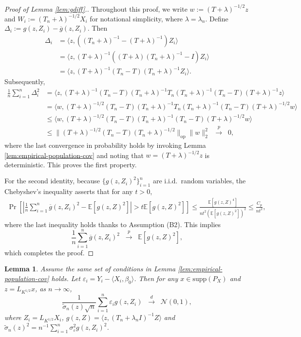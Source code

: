 \documentclass[11pt,a4paper]{article}
\renewcommand{\tilde}{\widetilde}
\renewcommand{\bar}{\overline}
\theoremstyle{definition}
\theoremstyle{plain}
\newtheorem{lemma}{Lemma}[section]
\theoremstyle{remark}
\newcommand{\supp}{\mathrm{supp}}
\newcommand{\op}{\mathrm{op}}
\begin{document}
\begin{proof}[Proof of Lemma \ref{lem:gdiff}.]
Throughout this proof, we write $w := (T+\lambda)^{-1/2} z$ and $W_i := (T_n+\lambda)^{-1/2}X_i$ for notational simplicity, where $\lambda=\lambda_n$.
Define $\Delta_i := g(z,Z_i)-\bar g(z,Z_i)$. Then
\begin{align*}
\Delta_i &= \langle z,((T_n+\lambda )^{-1}-(T+\lambda )^{-1})Z_i\rangle\nonumber\\
&= \langle z, (T+\lambda )^{-1}((T+\lambda )(T_n+\lambda )^{-1}-I)Z_i\rangle\nonumber\\
&= \langle z, (T+\lambda )^{-1}(T_n-T)(T_n+\lambda )^{-1}Z_i\rangle.
\end{align*}
Subsequently,
\begin{align}
\frac{1}{n}\sum_{i=1}^n \Delta_i^2 &= \langle z, (T+\lambda)^{-1}(T_n-T)(T_n+\lambda)^{-1}T_n(T_n+\lambda)^{-1}(T_n-T)(T+\lambda)^{-1}z\rangle\nonumber\\
&= \langle w, (T+\lambda)^{-1/2}(T_n-T)(T_n+\lambda)^{-1}T_n(T_n+\lambda)^{-1}(T_n-T)(T+\lambda)^{-1/2}w\rangle\nonumber\\
&\leq \langle w, (T+\lambda)^{-1/2}(T_n-T)(T_n+\lambda)^{-1}(T_n-T)(T+\lambda)^{-1/2}w\rangle\nonumber\\
&\leq \|(T+\lambda)^{-1/2}(T_n-T)(T_n+\lambda)^{-1/2}\|_\op\|w\|_2^2\;\; \overset{p}{\to}\;\; 0,
\end{align}
where the last convergence in probability holds by invoking Lemma \ref{lem:empirical-population-cov} and noting that $w=(T+\lambda)^{-1/2}z$ is deterministic. This proves the first property.

For the second identity, because $\{g(z,Z_i)^2\}_{i=1}^n$ are i.i.d.~random variables,
the Chebyshev's inequality asserts that for any $t>0$, 
\begin{align*}
\Pr\left[\left|\frac{1}{n}\sum_{i=1}^n \bar g(z,Z_i)^2 - \mathbb E[g(z,Z)^2]\right| > t\mathbb E[g(z,Z)^2]\right] \leq \frac{\mathbb E[g(z,Z)^4]}{nt^2(\mathbb E[g(z,Z)^2])^2} \leq \frac{C_p}{nt^2},
\end{align*}
where the last inequality holds thanks to Assumption (B2). This implies
\begin{equation*}
\frac{1}{n}\sum_{i=1}^n\bar g(z,Z_i)^2 \;\;\overset{p}{\to}\;\; \mathbb E[g(z,Z)^2],
\end{equation*} 
which completes the proof.
\end{proof}

\begin{lemma}
Assume the same set of conditions in Lemma \ref{lem:empirical-population-cov} holds. 
Let $\varepsilon_i = Y_i - \langle X_i,\beta_0\rangle$. 
Then for any $x\in\supp(P_X)$ and $z=L_{K^{1/2}}x$, as $n\to\infty$, 
$$
\frac{1}{\tilde\sigma_n(z)\sqrt{n}}\sum_{i=1}^n \varepsilon_i g(z,Z_i)\;\;\overset{d}{\to}\;\; \mathcal N(0,1),
$$
where $Z_i=L_{K^{1/2}}X_i$, $g(z,Z)=\langle z,(T_n+\lambda_n I)^{-1}Z\rangle$ and $\tilde\sigma_n(z)^2 = n^{-1}\sum_{i=1}^n \sigma_\varepsilon^2g(z,Z_i)^2$.
\label{lem:isoclt}
\end{lemma}
\end{document}
